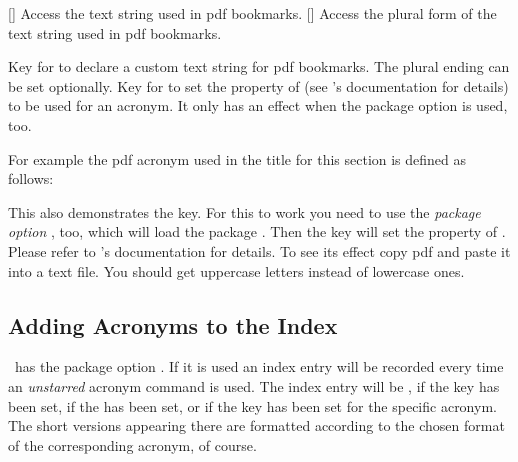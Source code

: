 \documentclass[load-preamble+,scrartcl={DIV10}]{cnltx-doc}
\begin{document}
\begin{commands}
  []
    Access the text string used in \acs{pdf} bookmarks.
  []
    Access the plural form of the text string used in \acs{pdf} bookmarks.
\end{commands}
\begin{options}
    Key for  to declare a custom text string for \acs{pdf}
    bookmarks.  The plural ending can be set optionally.
    Key for  to set the 
    property of  (see 's documentation for
    details) to be used for an acronym.  It only has an effect when the
    package option  is used, too.
\end{options}
  
For example the \acs{pdf} acronym used in the title for this section is defined
as follows:
\begin{sourcecode}
\end{sourcecode}
 
This also demonstrates the  key.  For this to work you need to
use the \emph{package option} , too, which will load the
package .  Then the key  will set the
 property of .  Please refer to
's documentation for details.  To see its effect copy \ac{pdf}
and paste it into a text file.  You should get uppercase letters instead of
lowercase ones.

\subsection{Adding Acronyms to the Index}\label{ssec:index}
\noindent{}\acro\ has the package option .  If it is
used an index entry will be recorded every time an \emph{unstarred} acronym
command is used.  The index entry will be ,
 if the  key has been set,
 if the  has been set,
or  if the key  has been set for the specific
acronym.  The short versions appearing there are formatted according to the
chosen format of the corresponding acronym, of course.
\end{document}
